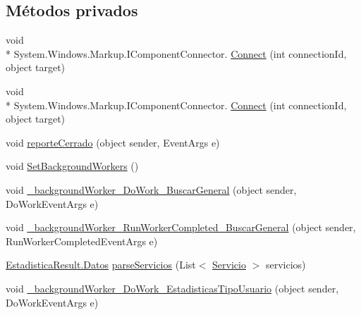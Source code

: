 \subsection*{Métodos privados}
\begin{DoxyCompactItemize}
\item 
void \\*
System.\-Windows.\-Markup.\-I\-Component\-Connector. \hyperlink{class_proyecto___integrador__3_1_1_reportes_1_1_reporte_frecuencia_de_uso_a592c9a15278659afd7ca868e5b20ea65}{Connect} (int connection\-Id, object target)
\item 
void \\*
System.\-Windows.\-Markup.\-I\-Component\-Connector. \hyperlink{class_proyecto___integrador__3_1_1_reportes_1_1_reporte_frecuencia_de_uso_a592c9a15278659afd7ca868e5b20ea65}{Connect} (int connection\-Id, object target)
\item 
void \hyperlink{class_proyecto___integrador__3_1_1_reportes_1_1_reporte_frecuencia_de_uso_a4b2535d30960eeadac98c0629d2bb246}{reporte\-Cerrado} (object sender, Event\-Args e)
\item 
void \hyperlink{class_proyecto___integrador__3_1_1_reportes_1_1_reporte_frecuencia_de_uso_aeecd10971fbcdb28fa27ae4dd46597fa}{Set\-Background\-Workers} ()
\item 
void \hyperlink{class_proyecto___integrador__3_1_1_reportes_1_1_reporte_frecuencia_de_uso_abd1eb5e19f667e3e66e2d81cb8a06801}{\-\_\-background\-Worker\-\_\-\-Do\-Work\-\_\-\-Buscar\-General} (object sender, Do\-Work\-Event\-Args e)
\item 
void \hyperlink{class_proyecto___integrador__3_1_1_reportes_1_1_reporte_frecuencia_de_uso_af8847d828992da2c7a993175d2a1e4a3}{\-\_\-background\-Worker\-\_\-\-Run\-Worker\-Completed\-\_\-\-Buscar\-General} (object sender, Run\-Worker\-Completed\-Event\-Args e)
\item 
\hyperlink{struct_proyecto___integrador__3_1_1_reportes_1_1_reporte_frecuencia_de_uso_1_1_estadistica_result_1_1_datos}{Estadistica\-Result.\-Datos} \hyperlink{class_proyecto___integrador__3_1_1_reportes_1_1_reporte_frecuencia_de_uso_ad858394f90552b0c6240293e2acf2bdd}{parse\-Servicios} (List$<$ \hyperlink{class_proyecto___integrador__3_1_1_tipos_dato_1_1_servicio}{Servicio} $>$ servicios)
\item 
void \hyperlink{class_proyecto___integrador__3_1_1_reportes_1_1_reporte_frecuencia_de_uso_a4cabbcb55d061df36809f52408c6e5c6}{\-\_\-background\-Worker\-\_\-\-Do\-Work\-\_\-\-Estadisticas\-Tipo\-Usuario} (object sender, Do\-Work\-Event\-Args e)

\end{DoxyCompactItemize}
